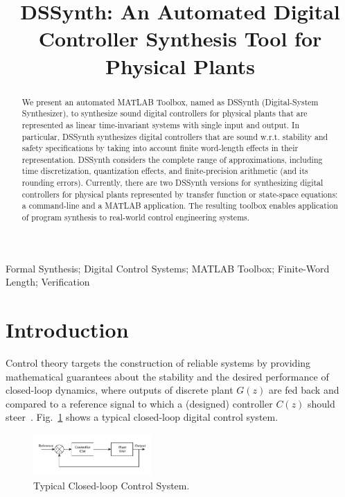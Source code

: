 \documentclass[10pt,conference]{IEEEtran}
\begin{document}
\title{DSSynth: An Automated Digital Controller Synthesis Tool for Physical Plants} 


\maketitle

\begin{abstract}
We present an automated MATLAB Toolbox, named as DSSynth 
(Digital-System Synthesizer), to synthesize sound digital controllers 
for physical plants that are represented as linear time-invariant
systems with single input and output. In particular, DSSynth synthesizes digital 
controllers that are sound w.r.t. stability and safety specifications by taking into account finite word-length 
effects in their representation. DSSynth considers the complete range
of approximations, including time discretization, quantization effects, 
and finite-precision arithmetic (and its rounding errors). 
Currently, there are two DSSynth versions for synthesizing digital controllers for physical plants 
represented by transfer function or state-space equations: a command-line and 
a MATLAB application. The resulting toolbox 
enables application of program synthesis to real-world control engineering systems.
\end{abstract}

%
%
\begin{IEEEkeywords}
Formal Synthesis; Digital Control Systems; MATLAB Toolbox; Finite-Word Length; Verification
\end{IEEEkeywords}

\section{Introduction}

Control theory targets the construction of reliable systems by providing mathematical guarantees about the stability and the desired 
performance of closed-loop dynamics, where outputs of discrete plant $G(z)$ 
are fed back and compared to a reference signal to which a (designed) 
controller $C(z)$ should steer~\cite{astrom1997computer}. 
Fig.~\ref{fig:typical-control-system} shows a typical closed-loop digital control system.
%
\begin{figure}[ht!]
\centering
\includegraphics[width=0.4\textwidth]{closedloopseries.pdf}
\caption{Typical Closed-loop Control System.}
\label{fig:typical-control-system}
\end{figure}
\end{document}
